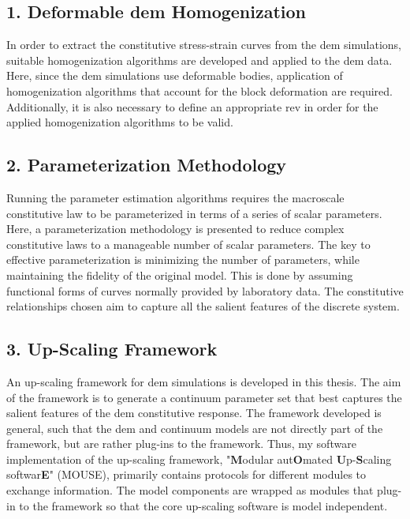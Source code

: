 \subsection*{1. Deformable \acrshort{dem} Homogenization}

In order to extract the constitutive stress-strain curves from the \acrshort{dem} simulations, suitable homogenization algorithms are developed and applied to the \acrshort{dem} data. Here, since the \acrshort{dem} simulations use deformable bodies, application of homogenization algorithms that account for the block deformation are required.  Additionally, it is also necessary to define an appropriate \acrshort{rev} in order for the applied homogenization algorithms to be valid.

\subsection*{2. Parameterization Methodology}

Running the parameter estimation algorithms requires the macroscale constitutive law to be parameterized in terms of a series of scalar parameters. Here, a parameterization methodology is presented to reduce complex constitutive laws to a manageable number of scalar parameters. The key to effective parameterization is minimizing the number of parameters, while maintaining the fidelity of the original model. This is done by assuming functional forms of curves normally provided by laboratory data. The constitutive relationships chosen aim to capture all the salient features of the discrete system. 

\subsection*{3. Up-Scaling Framework}

An up-scaling framework for \acrshort{dem} simulations is developed in this thesis. The aim of the framework is to generate a continuum parameter set that best captures the salient features of the \acrshort{dem} constitutive response. The framework developed is general, such that the \acrshort{dem} and continuum models are not directly part of the framework, but are rather plug-ins to the framework. Thus, my software implementation of the up-scaling framework, "\textbf{M}odular aut\textbf{O}mated \textbf{U}p-\textbf{S}caling softwar\textbf{E}" (MOUSE), primarily contains protocols for different modules to exchange information. The model components are wrapped as modules that plug-in to the framework so that the core up-scaling software is model independent. 

